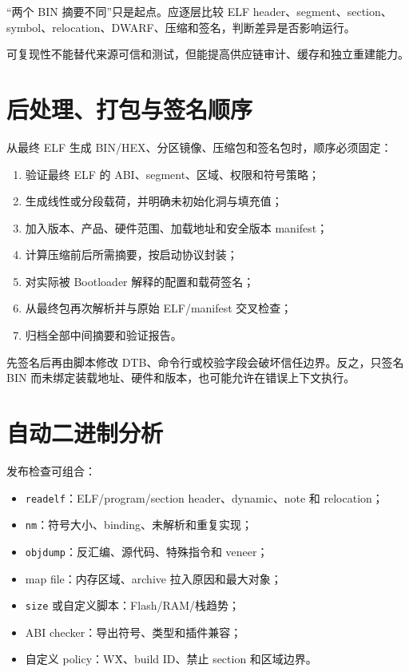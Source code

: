 “两个 BIN 摘要不同”只是起点。应逐层比较 ELF header、segment、section、symbol、relocation、DWARF、压缩和签名，判断差异是否影响运行。

可复现性不能替代来源可信和测试，但能提高供应链审计、缓存和独立重建能力。

\section{后处理、打包与签名顺序}

从最终 ELF 生成 BIN/HEX、分区镜像、压缩包和签名包时，顺序必须固定：

\begin{enumerate}
  \item 验证最终 ELF 的 ABI、segment、区域、权限和符号策略；
  \item 生成线性或分段载荷，并明确未初始化洞与填充值；
  \item 加入版本、产品、硬件范围、加载地址和安全版本 manifest；
  \item 计算压缩前后所需摘要，按启动协议封装；
  \item 对实际被 Bootloader 解释的配置和载荷签名；
  \item 从最终包再次解析并与原始 ELF/manifest 交叉检查；
  \item 归档全部中间摘要和验证报告。
\end{enumerate}

先签名后再由脚本修改 DTB、命令行或校验字段会破坏信任边界。反之，只签名 BIN 而未绑定装载地址、硬件和版本，也可能允许在错误上下文执行。

\section{自动二进制分析}

发布检查可组合：

\begin{itemize}
  \item \texttt{readelf}：ELF/program/section header、dynamic、note 和 relocation；
  \item \texttt{nm}：符号大小、binding、未解析和重复实现；
  \item \texttt{objdump}：反汇编、源代码、特殊指令和 veneer；
  \item map file：内存区域、archive 拉入原因和最大对象；
  \item \texttt{size} 或自定义脚本：Flash/RAM/栈趋势；
  \item ABI checker：导出符号、类型和插件兼容；
  \item 自定义 policy：W\^X、build ID、禁止 section 和区域边界。
\end{itemize}

